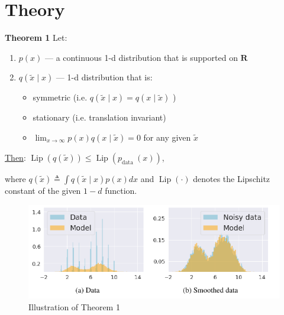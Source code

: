 \documentclass[t]{beamer}  %
\begin{document}
\section{Theory \cite{orig}}
\begin{frame}[t]
\textbf{Theorem 1} Let: 
\begin{enumerate}
    \item $p(x)$ --- a continuous 1-d distribution that is supported on $\bm{R}$
    \item $q(\tilde{x} \mid x)$ --- 1-d distribution that is:
    \begin{itemize}
        \item symmetric (i.e. $q(\tilde{x} \mid x)=q(x \mid \tilde{x})$ )
        \item stationary (i.e. translation invariant)
        \item $\lim _{x \rightarrow \infty} p(x) q(x \mid \tilde{x})=0$ for any given $\tilde{x}$
    \end{itemize}
\end{enumerate}
\underline{Then}:
$\operatorname{Lip}(q(\tilde{x})) \leq \operatorname{Lip}\left(p_{\text {data }}(x)\right)$,

where $q(\tilde{x}) \triangleq \int q(\tilde{x} \mid x) p(x) d x$ and $\operatorname{Lip}(\cdot)$ denotes the Lipschitz constant of the given $1-d$ function.

\begin{figure}[h]

\includegraphics[scale=1]{images/ill_th1.pdf}
\caption{ Illustration of Theorem 1 \cite{orig}}
\end{figure}
\end{frame}
\end{document}
